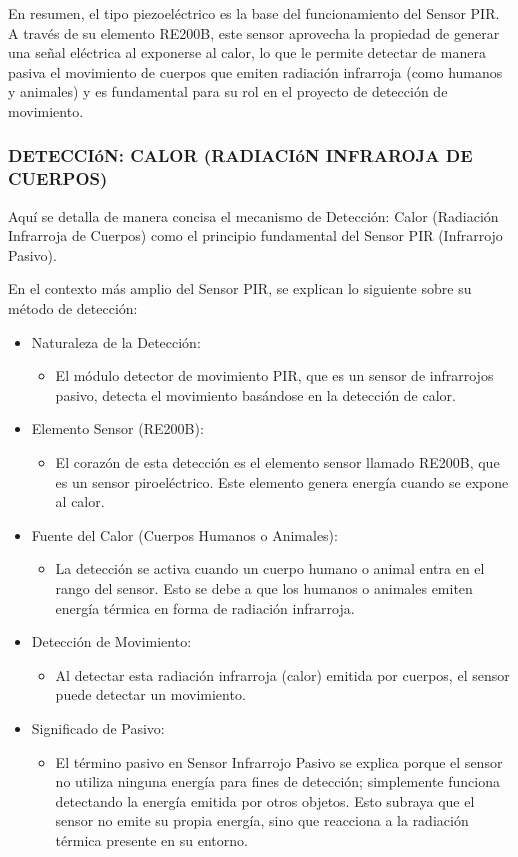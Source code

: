 \documentclass{report}
\begin{document}
En resumen, el tipo piezoeléctrico es la base del funcionamiento del Sensor PIR. A través de su elemento RE200B, este sensor aprovecha la propiedad 
de generar una señal eléctrica al exponerse al calor, lo que le permite detectar de manera pasiva el movimiento de cuerpos que emiten radiación 
infrarroja (como humanos y animales) y es fundamental para su rol en el proyecto de detección de movimiento.

\subsubsection{DETECCIóN: CALOR (RADIACIóN INFRAROJA DE CUERPOS)}
Aquí se detalla de manera concisa el mecanismo de Detección: Calor (Radiación Infrarroja de Cuerpos) 
como el principio fundamental del Sensor PIR (Infrarrojo Pasivo).

En el contexto más amplio del Sensor PIR, se  explican lo siguiente sobre su método de detección:
\begin{itemize}
    \item Naturaleza de la Detección:
    \begin{itemize}
        \item El módulo detector de movimiento PIR, que es un sensor de infrarrojos pasivo, detecta el movimiento basándose en la detección de calor.
    \end{itemize}
    \item Elemento Sensor (RE200B):
    \begin{itemize}
        \item El corazón de esta detección es el elemento sensor llamado RE200B, que es un sensor piroeléctrico. Este elemento genera energía cuando se 
        expone al calor.
    \end{itemize}
    \item Fuente del Calor (Cuerpos Humanos o Animales):
    \begin{itemize}
        \item La detección se activa cuando un cuerpo humano o animal entra en el rango del sensor. Esto se debe a que los humanos o animales emiten 
        energía térmica en forma de radiación infrarroja.
    \end{itemize}
    \item Detección de Movimiento:
    \begin{itemize}
        \item Al detectar esta radiación infrarroja (calor) emitida por cuerpos, el sensor puede detectar un movimiento.
    \end{itemize}
    \item Significado de Pasivo:
    \begin{itemize}
        \item El término pasivo en Sensor Infrarrojo Pasivo se explica porque el sensor no utiliza ninguna energía para fines de detección; simplemente 
        funciona detectando la energía emitida por otros objetos. Esto subraya que el sensor no emite su propia energía, sino que reacciona a la radiación 
        térmica presente en su entorno.
    \end{itemize}
\end{itemize}
\end{document}
